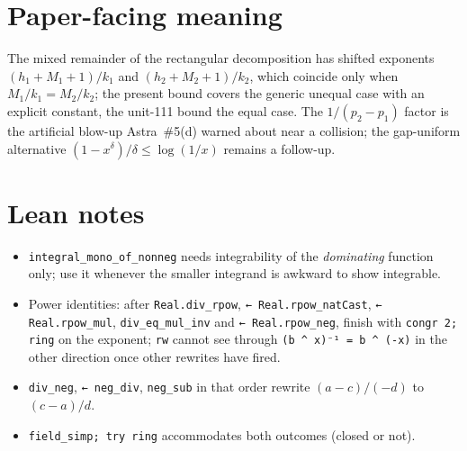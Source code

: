 \documentclass[11pt]{article}
\begin{document}
\section{Paper-facing meaning}

The mixed remainder of the rectangular decomposition has shifted exponents
$(h_1+M_1+1)/k_1$ and $(h_2+M_2+1)/k_2$, which coincide only when $M_1/k_1=M_2/k_2$; the present
bound covers the generic unequal case with an explicit constant, the unit-111 bound the equal case.
The $1/(p_2-p_1)$ factor is the artificial blow-up Astra~\#5(d) warned about near a collision; the
gap-uniform alternative $(1-x^\delta)/\delta\le\log(1/x)$ remains a follow-up.

\section{Lean notes}

\begin{itemize}
\item \texttt{integral\_mono\_of\_nonneg} needs integrability of the \emph{dominating} function
only; use it whenever the smaller integrand is awkward to show integrable.
\item Power identities: after \texttt{Real.div\_rpow}, \texttt{← Real.rpow\_natCast},
\texttt{← Real.rpow\_mul}, \texttt{div\_eq\_mul\_inv} and \texttt{← Real.rpow\_neg}, finish with
\texttt{congr 2; ring} on the exponent; \texttt{rw} cannot see through
\texttt{(b \^{} x)⁻¹ = b \^{} (-x)} in the other direction once other rewrites have fired.
\item \texttt{div\_neg}, \texttt{← neg\_div}, \texttt{neg\_sub} in that order rewrite
$(a-c)/(-d)$ to $(c-a)/d$.
\item \texttt{field\_simp; try ring} accommodates both outcomes (closed or not).
\end{itemize}
\end{document}
